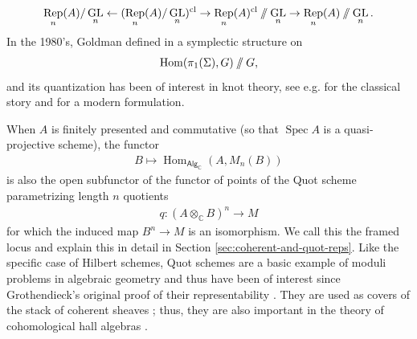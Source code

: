\documentclass{article}
\numberwithin{equation}{section}
\theoremstyle{quest}
\theoremstyle{definition}
\theoremstyle{remark}
\DeclareMathOperator{\GL}{GL}
\DeclareMathOperator{\Hom}{Hom}
\DeclareMathOperator{\Spec}{Spec}
\DeclareMathOperator{\Rep}{Rep}
\newcommand{\git}{\mathbin{
  \mathchoice{/\mkern-6mu/}%
    {/\mkern-6mu/}%
    {/\mkern-5mu/}%
    {/\mkern-5mu/}}}%
\begin{document}
\begin{align*}
	\Rep_n(A) /\GL_n\leftarrow  (\Rep_n(A) /\GL_n)^{\text{cl}}\to \Rep_n(A)^{\text{cl}}\git \GL_n\to \Rep_n(A) \git \GL_n.
\end{align*} 
In the 1980's, Goldman defined in \cite{gold} a symplectic structure on
\begin{align*}
	\Hom(\pi_1(\Sigma),G) \git G,
\end{align*} 
and its quantization has been of interest in knot theory, see e.g. \cite{turaev-skein,AMR96,AMR98} for the classical story and \cite{BZBJ,jordan-survey} for a modern formulation.

When $A$ is finitely presented and commutative (so that $\Spec A$ is a quasi-projective scheme), the functor
\begin{align*}
	B\mapsto \Hom_{\mathsf{Alg}_{\mathbb{C} }}(A,M_n(B))
\end{align*} 
is also the open subfunctor of the functor of points of the Quot scheme parametrizing length $n$ quotients 
\begin{align*}
	q:(A\otimes_{\mathbb{C} }B)^n\to M
\end{align*} 
for which the induced map $B^n\to M$ is an isomorphism. We call this the framed locus and explain this in detail in Section \ref{sec:coherent-and-quot-reps}. Like the specific case of Hilbert schemes, Quot schemes are a basic example of moduli problems in algebraic geometry and thus have been of interest since Grothendieck's original proof of their representability \cite{grothendieck-quot,nitsure-quot,huybrechts-lehn}. They are used as covers of the stack of coherent sheaves \cite{huybrechts-lehn}; thus, they are also important in the theory of cohomological hall algebras \cite{KV,PS}.
\end{document}
